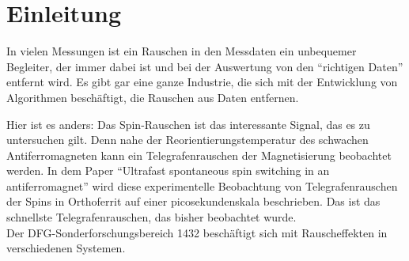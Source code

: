 \documentclass[main.tex]{subfiles}
\begin{document}
\section{Einleitung}

In vielen Messungen ist ein Rauschen in den Messdaten ein unbequemer Begleiter, der immer dabei ist und bei der Auswertung von den \enquote{richtigen Daten} entfernt wird. 
Es gibt gar eine ganze Industrie, die sich mit der Entwicklung von Algorithmen beschäftigt, die Rauschen aus Daten entfernen.\\


Hier ist es anders: Das Spin-Rauschen ist das interessante Signal, das es zu untersuchen gilt. Denn nahe der Reorientierungstemperatur des schwachen Antiferromagneten kann ein Telegrafenrauschen der Magnetisierung beobachtet werden. 
In dem Paper \enquote{Ultrafast spontaneous spin switching in an antiferromagnet} \cite{weiss-ultrafast} wird diese experimentelle Beobachtung von Telegrafenrauschen der Spins in Orthoferrit auf einer picosekundenskala beschrieben. Das ist das schnellste Telegrafenrauschen, das bisher beobachtet wurde.\\

Der DFG-Sonderforschungsbereich 1432 \cite{sfb-1432} beschäftigt sich mit Rauscheffekten in verschiedenen Systemen.\\
\end{document}
